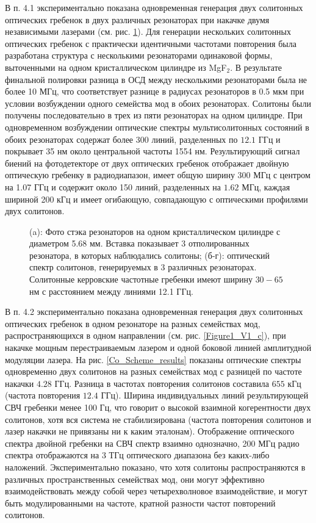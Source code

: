 В п. 4.1 экспериментально показана одновременная генерация двух солитонных оптических гребенок в двух различных резонаторах при накачке двумя независимыми лазерами (см. рис. \ref{ris:image1}). Для генерации нескольких солитонных оптических гребенок с практически идентичными частотами повторения была разработана структура с несколькими резонаторами одинаковой формы, выточенными на одном кристаллическом цилиндре из MgF$_2$. В результате финальной полировки разница в ОСД между несколькими резонаторами была не более 10 МГц, что соответствует разнице в радиусах резонаторов в 0.5 мкм при условии возбуждении одного семейства мод в обоих резонаторах. Солитоны были получены последовательно в трех из пяти резонаторах на одном цилиндре. При одновременном возбуждении оптические спектры мультисолитонных состояний в обоих резонаторах содержат более 300 линий, разделенных по $12.1$ ГГц и покрывает 35 нм около центральной частоты 1554 нм. Результирующий сигнал биений на фотодетекторе от двух оптических гребенок отображает двойную оптическую гребенку в радиодиапазон, имеет общую ширину 300 МГц с центром на 1.07 ГГц и содержит около 150 линий, разделенных на $1.62$ МГц, каждая шириной 200 кГц и имеет огибающую, совпадающую с оптическими профилями двух солитонов.

\begin{figure}[!htb]
\begin{minipage}{1\linewidth}
\end{minipage}
\caption{(a): Фото стэка резонаторов на одном кристаллическом цилиндре с диаметром 5.68 мм. Вставка показывает 3 отполированных резонатора, в которых наблюдались солитоны; (б-г): оптический спектр солитонов, генерируемых в 3 различных резонаторах. Солитонные керровские частотные гребенки имеют ширину $30 - 65$ нм с расстоянием между линиями 12.1 ГГц.}
\label{ris:image1}
\end{figure}

В п. 4.2 экспериментально показана одновременная генерация двух солитонных оптических гребенок в одном резонаторе на разных семействах мод, распространяющихся в одном направлении (см. рис. \ref{Figure1_V1_c}), при накачке мощным перестраиваемым лазером и одной боковой линией амплитудной модуляции лазера. На рис. \ref{Co_Scheme_results} показаны оптические спектры одновременно двух солитонов на разных семействах мод с разницей по частоте накачки $4.28$ ГГц. Разница в частотах повторения солитонов составила $655$ кГц (частота повторения $12.4$ ГГц). Ширина индивидуальных линий результирующей СВЧ гребенки менее 100 Гц, что говорит о высокой взаимной когерентности двух солитонов, хотя вся система не стабилизирована (частота повторения солитонов и лазер накачки не привязаны ни к каким эталонам). Отображение оптического спектра двойной гребенки на СВЧ спектр взаимно однозначно, 200 МГц радио спектра отображаются на 3 ТГц оптического диапазона без каких-либо наложений. Экспериментально показано, что хотя солитоны распространяются в различных пространственных семействах мод, они могут эффективно взаимодействовать между собой через четырехволновое взаимодействие, и могут быть модулированными на частоте, кратной разности частот повторений солитонов.

